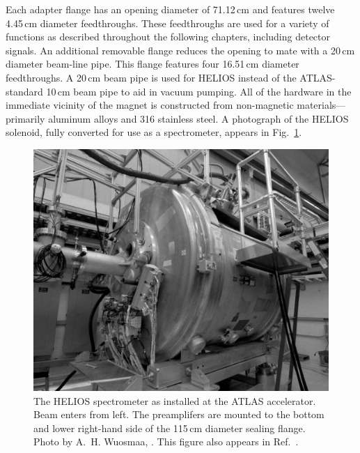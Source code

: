 Each adapter flange has an opening diameter of 71.12\,cm and features twelve 4.45\,cm diameter feedthroughs.  These feedthroughs are used for a variety of functions as described throughout the following chapters, including detector signals.  An additional removable flange reduces the opening to mate with a 20\,cm diameter beam-line pipe.  This flange features four 16.51\,cm diameter feedthroughs.  A 20\,cm beam pipe is used for HELIOS instead of the ATLAS-standard 10\,cm beam pipe to aid in vacuum pumping.  All of the hardware in the immediate vicinity of the magnet is constructed from non-\-magnetic materials---primarily aluminum alloys and 316 stainless steel.  A photograph of the HELIOS solenoid, fully converted for use as a spectrometer, appears in Fig.~\ref{solenoid}.

\begin{figure}
\centering
\includegraphics[width=\linewidth,height=0.4\textheight,keepaspectratio]{NIM_Paper/Figures/DSC_0792_compressed}
\caption[The HELIOS spectrometer as installed at the ATLAS accelerator]{The HELIOS spectrometer as installed at the ATLAS accelerator.  Beam enters from left.  The preamplifers are mounted to the bottom and lower right-hand side of the 115\,cm diameter sealing flange.  Photo by A.~H. Wuosmaa, \photodate{}.  This figure also appears in Ref.~\cite{Lighthall_2010}.}
\label{solenoid}
\end{figure}

